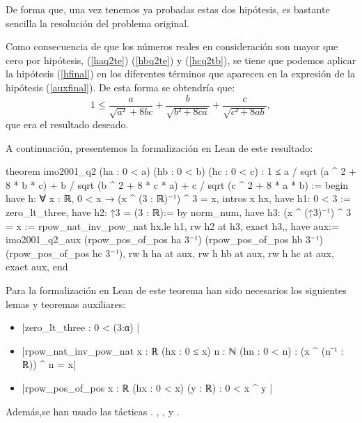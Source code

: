 \begin{demostracion}
  De forma que, una vez tenemos ya probadas estas dos hipótesis, es bastante
  sencilla la resolución del problema original.

  Como consecuencia de que los números reales en consideración son mayor que
  cero por hipótesis, (\ref{haq2te}) (\ref{hbq2te}) y (\ref{hcq2tb}), se
  tiene que podemos aplicar la hipótesis (\ref{hfinal}) en los diferentes
  términos que aparecen en la expresión de la hipótesis (\ref{auxfinal}).
  De esta forma se obtendría que:
  \begin{equation}
    1≤\frac{a}{\sqrt{a²}+8bc}+\frac{b}{\sqrt{b²+8ca}}+
    \frac{c}{\sqrt{c²+8ab}},
  \end{equation}
  que era el resultado deseado.
\end{demostracion}

A continuación, presentemos la formalización en Lean de este resultado:

\begin{leancode}
theorem imo2001_q2 (ha : 0 < a) (hb : 0 < b) (hc : 0 < c) :
  1 ≤ a / sqrt (a ^ 2 + 8 * b * c) +
      b / sqrt (b ^ 2 + 8 * c * a) +
      c / sqrt (c ^ 2 + 8 * a * b) :=
begin
  have h: ∀ {x : ℝ}, 0 < x → (x ^ (3 : ℝ)⁻¹) ^ 3 = x,
  {intros x hx,
  have h1: 0 < 3 := zero_lt_three, 
  have h2: ↑3 = (3 : ℝ):= by norm_num,
  have h3: (x ^ (↑3)⁻¹) ^ 3 = x := rpow_nat_inv_pow_nat hx.le h1,
  rw h2 at h3,
  exact h3,},
  have aux:= imo2001_q2_aux (rpow_pos_of_pos ha 3⁻¹) 
  (rpow_pos_of_pos hb 3⁻¹) (rpow_pos_of_pos hc 3⁻¹),
  rw h ha at aux,
  rw h hb at aux,
  rw h hc at aux,
  exact aux,
end
\end{leancode}

Para la formalización en Lean de este teorema han sido necesarios los
siguientes lemas y teoremas auxiliares:
\begin{itemize}
\item {}|zero_lt_three : 0 < (3:α) |
\item {}|rpow_nat_inv_pow_nat {x : ℝ} (hx : 0 ≤ x) {n : ℕ} (hn : 0 < n) :
  (x ^ (n⁻¹ : ℝ)) ^ n = x|
\item {}|rpow_pos_of_pos {x : ℝ} (hx : 0 < x) (y : ℝ) : 0 < x ^ y |
\end{itemize}

Además,se han usado las tácticas
.
,
,
 y
.
